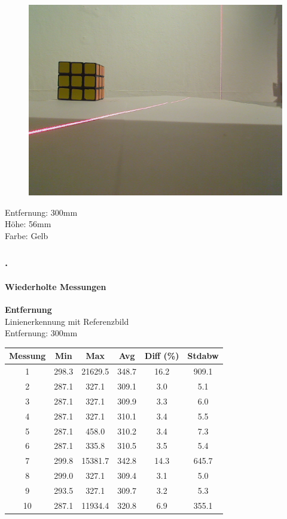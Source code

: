 \documentclass[xcolor=dvipsnames]{beamer}
\def\frametitlesec{\frametitle{\arabic{section}.\hspace{0.5ex}\insertsection}}
\def\framesubtitles#1{\framesubtitle{\hspace{3.5ex}#1}}
\begin{document}
\begin{frame}
\begin{figure}
\begin{minipage}{0.32\linewidth}
		\end{minipage}
		\hfill
		\begin{minipage}{0.32\linewidth}
			\includegraphics[width=\linewidth]{includes/test_repeat_3}
		\end{minipage}
	\end{figure}
	
	Entfernung: 300mm\\
	Höhe: 56mm\\
	Farbe: Gelb

\end{frame}
	
\begin{frame}
	\frametitlesec
	\framesubtitles{Wiederholte Messungen}
		\textbf{Entfernung}\\
	
		Linienerkennung mit Referenzbild\\
		Entfernung: 300mm
		
		\begin{tabular}{c|c|c|c|c|c}
			Messung & Min & Max & Avg & Diff (\%) & Stdabw \\ \hline
1 & 298.3 & 21629.5 & 348.7 & 16.2 & 909.1 \\
2 & 287.1 & 327.1 & 309.1 & 3.0 & 5.1 \\
3 & 287.1 & 327.1 & 309.9 & 3.3 & 6.0 \\
4 & 287.1 & 327.1 & 310.1 & 3.4 & 5.5 \\
5 & 287.1 & 458.0 & 310.2 & 3.4 & 7.3 \\
6 & 287.1 & 335.8 & 310.5 & 3.5 & 5.4 \\
7 & 299.8 & 15381.7 & 342.8 & 14.3 & 645.7 \\
8 & 299.0 & 327.1 & 309.4 & 3.1 & 5.0 \\
9 & 293.5 & 327.1 & 309.7 & 3.2 & 5.3 \\
10 & 287.1 & 11934.4 & 320.8 & 6.9 & 355.1
		\end{tabular}
		
\end{frame}
	
\end{document}
